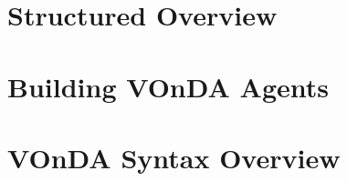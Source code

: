 \documentclass[a4paper]{report}
\newcommand{\vonda}{VOnDA\xspace}
\begin{document}
\chapter{Structured Overview}

\newpage

\newpage

\newpage



\chapter{Building \vonda Agents}

\newpage
\chapter{\vonda Syntax Overview}




\end{document}
